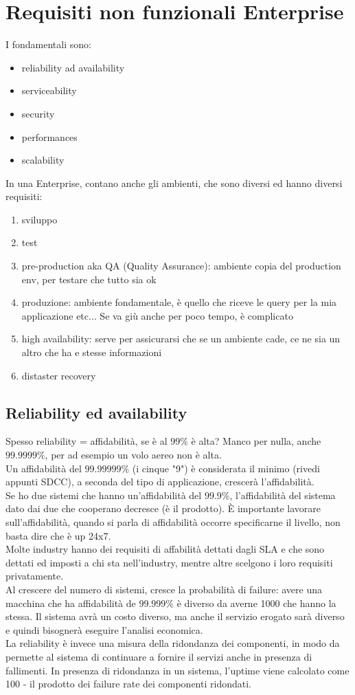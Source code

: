 \documentclass{article}
\begin{document}
\section{Requisiti non funzionali Enterprise}
I fondamentali sono:
\begin{itemize}
\item reliability ad availability
\item serviceability
\item security
\item performances
\item scalability
\end{itemize}
In una Enterprise, contano anche gli ambienti, che sono diversi ed hanno diversi requisiti:
\begin{enumerate}
\item sviluppo
\item test
\item pre-production aka QA (Quality Assurance): ambiente copia del production env, per testare che tutto sia ok
\item produzione: ambiente fondamentale, è quello che riceve le query per la mia applicazione etc... Se va giù anche per poco tempo, è complicato
\item high availability: serve per assicurarsi che se un ambiente cade, ce ne sia un altro che ha e stesse informazioni
\item distaster recovery
\end{enumerate}
\subsection{Reliability ed availability}
Spesso reliability = affidabilità, se è al $99\%$ è alta? Manco per nulla, anche $99.9999\%$, per ad esempio un volo aereo non è alta.\\ Un affidabilità del $99.99999\%$ (i cinque "9") è considerata il minimo (rivedi appunti SDCC), a seconda del tipo di applicazione, crescerà l'affidabilità.\\ Se ho due sistemi che hanno un'affidabilità del $99.9\%$, l'affidabilità del sistema dato dai due che cooperano decresce (è il prodotto). È importante lavorare sull'affidabilità, quando si parla di affidabilità occorre specificarne il livello, non basta dire che è up 24x7.\\ Molte industry hanno dei requisiti di affabilità dettati dagli SLA e che sono dettati ed imposti a chi sta nell'industry, mentre altre scelgono i loro requisiti privatamente.\\ Al crescere del numero di sistemi, cresce la probabilità di failure: avere una macchina che ha affidabilità de $99.999\%$ è diverso da averne 1000 che hanno la stessa. Il sistema avrà un costo diverso, ma anche il servizio erogato sarà diverso e quindi bisognerà eseguire l'analisi economica.\\ La reliability è invece una misura della ridondanza dei componenti, in modo da permette al sistema di continuare a fornire il servizi anche in presenza di fallimenti. In presenza di ridondanza in un sistema, l'uptime viene calcolato come 100 - il prodotto dei failure rate dei componenti ridondati.
\end{document}
